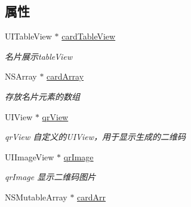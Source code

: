 \subsection*{属性}
\begin{DoxyCompactItemize}
\item 
\hypertarget{interface_card_view_controller_a28c04404c102ca3070f01843b682c66a}{U\-I\-Table\-View $\ast$ \hyperlink{interface_card_view_controller_a28c04404c102ca3070f01843b682c66a}{card\-Table\-View}}\label{interface_card_view_controller_a28c04404c102ca3070f01843b682c66a}

\begin{DoxyCompactList}\small\item\em 名片展示table\-View \end{DoxyCompactList}\item 
\hypertarget{interface_card_view_controller_a8d38af0727f6342827a44c8cc279468c}{N\-S\-Array $\ast$ \hyperlink{interface_card_view_controller_a8d38af0727f6342827a44c8cc279468c}{card\-Array}}\label{interface_card_view_controller_a8d38af0727f6342827a44c8cc279468c}

\begin{DoxyCompactList}\small\item\em 存放名片元素的数组 \end{DoxyCompactList}\item 
\hypertarget{interface_card_view_controller_a1984282f1134d68c03edfd889f41ee46}{U\-I\-View $\ast$ \hyperlink{interface_card_view_controller_a1984282f1134d68c03edfd889f41ee46}{qr\-View}}\label{interface_card_view_controller_a1984282f1134d68c03edfd889f41ee46}

\begin{DoxyCompactList}\small\item\em qr\-View 自定义的\-U\-I\-View，用于显示生成的二维码 \end{DoxyCompactList}\item 
\hypertarget{interface_card_view_controller_aa0cad1539bfab47dc163b4b528437ae1}{U\-I\-Image\-View $\ast$ \hyperlink{interface_card_view_controller_aa0cad1539bfab47dc163b4b528437ae1}{qr\-Image}}\label{interface_card_view_controller_aa0cad1539bfab47dc163b4b528437ae1}

\begin{DoxyCompactList}\small\item\em qr\-Image 显示二维码图片 \end{DoxyCompactList}\item 
\hypertarget{interface_card_view_controller_ad1f20231d1a58429435849832a916f90}{N\-S\-Mutable\-Array $\ast$ \hyperlink{interface_card_view_controller_ad1f20231d1a58429435849832a916f90}{card\-Arr}}\label{interface_card_view_controller_ad1f20231d1a58429435849832a916f90}


\end{DoxyCompactItemize}
